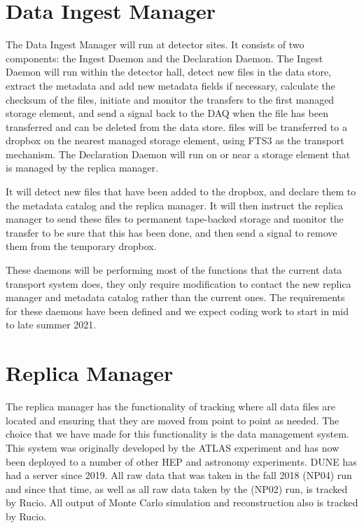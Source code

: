 \documentclass[../main-v1.tex]{subfiles}
\begin{document}
\section{Data Ingest Manager}

The Data Ingest Manager will run at detector sites.  It consists of two components:  the Ingest Daemon and the Declaration Daemon.  The Ingest Daemon will 
run within the detector hall, detect new files in the data store, extract the metadata and add new metadata fields
if necessary, calculate the checksum of the files, initiate and monitor the transfers to the first managed 
storage element, and send a signal back to the DAQ when the file has been transferred and can be deleted from the data store.
files will be transferred to a dropbox on the nearest managed storage element, using FTS3  as the transport mechanism.  
The Declaration Daemon will run on or near a storage element that is managed by the replica manager. 

It will detect new files that have been added to the dropbox, and declare them to the metadata catalog and the replica manager.  It will then instruct the replica manager to send these files to permanent tape-backed storage and monitor the transfer to be sure that this has been done, and then send a signal to remove them from the temporary dropbox.

These daemons will be performing most of the functions that the current data transport system does, they only 
require modification to contact the new replica manager and metadata catalog rather than the current ones.  The 
requirements for these daemons have been defined   and we expect coding work to start in mid to late summer 2021.

\section{Replica Manager}

The replica manager has the functionality of tracking where all data files are located and ensuring that they 
are moved from point to point as needed.  The choice that we have made for this functionality is the  data
management system\cite{Baritsis:2019csbs}.  This system was originally developed by the ATLAS experiment and has now been deployed to 
a number of other HEP and astronomy experiments.  DUNE has had a  server since 2019.  All raw data that was
taken in the fall 2018  (NP04) run and since that time, as well as all raw data taken by the  (NP02) run, is tracked by Rucio.  All output of Monte Carlo simulation and reconstruction also is tracked by Rucio. 
\end{document}
